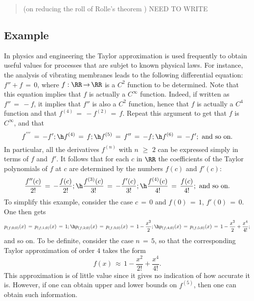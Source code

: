 \VV


\begin{quotation}
{\footnotesize \underline{\Note} (on reducing the roll of Rolle's theorem )
    NEED TO WRITE
}%
\end{quotation}


\VV

            \subsection{\small{\bf Example}}
            \label{ExampE20.76}

\V

        In physics and engineering the Taylor approximation is used frequently to obtain useful values for processes that are subjet to known physical laws.
    For instance, the analysis of vibrating membranes leads to the following differential equation:
    $f'' + f \,=\, 0$, where $f:{\RR} \,{\rightarrow}\, {\RR}$ is a $C^{2}$ function to be determined.
    Note that this equation implies that $f$ is actually a $C^{{\infty}}$ function.
    Indeed, if written as $f'' \,=\, -f$, it implies that $f''$ is also a $C^{2}$ function,
    hence that $f$ is actually a $C^{4}$ function and that $f^{(4)} \,=\, -f^{(2)} \,=\, f$.
    Repeat this argument to get that $f$ is $C^{{\infty}}$, and that
        \begin{displaymath}
        f^{'''} \,=\, -f'; \h f^{(4)} \,=\, f; \h f^{(5)} \,=\, f'' \,=\, -f; \h
        f^{(6)} \,=\, -f'; \mbox{ and so on}.
        \end{displaymath}
    In particular, all the derivatives $f^{(n)}$ with $n\,\,{\geq}\,\,2$ can be expressed simply in terms of $f$ and~$f'$.
    It follows that for each $c$ in ${\RR}$ the coefficients of the Taylor polynomials of $f$ at $c$ are determined by the numbers $f(c)$ and $f'(c)$:
        \begin{displaymath}
        \frac{f''(c)}{2!} \,=\, -\frac{f(c)}{2!}; \h \frac{f^{(3)}(c)}{3!} \,=\, -\frac{f'(c)}{3!}; \h \frac{f^{(4)}(c)}{4!} \,=\, \frac{f(c)}{4!}; \mbox{ and so on}.
        \end{displaymath}
    To simplify this example, consider the case $c \,=\, 0$ and $f(0) \,=\, 1$, $f'(0) \,=\, 0$. One then gets
        \begin{displaymath}
        p_{(f;0;0)}(x) \,=\, p_{(f;1;0)}(x) \,=\, 1; \h
        p_{(f;2;0)}(x) \,=\, p_{(f;3;0)}(x) \,=\, 1 - \frac{x^{2}}{2}; \h
        p_{(f;4;0)}(x) \,=\, p_{(f;5;0)}(x) \,=\, 1 - \frac{x^{2}}{2} + \frac{x^{4}}{4!};
        \end{displaymath}
    and so on. To be definite, consider the case $n \,=\, 5$, so that the corresponding Taylor approximation of order $4$ takes the form
        \begin{displaymath}
        f(x) \,{\approx}\, 1 - \frac{x^{2}}{2!} + \frac{x^{4}}{4!}.
        \end{displaymath}
    This approximation is of little value since it gives no indication of how accurate it is.
    However, if one can obtain upper and lower bounds on $f^{(5)}$, then one can obtain such information.

